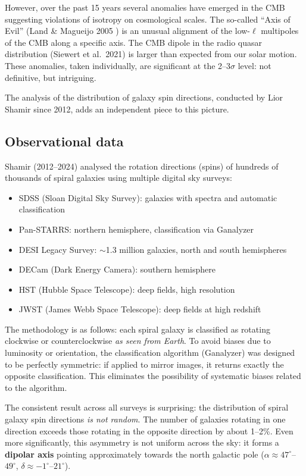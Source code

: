 \documentclass[10pt,a4paper]{article}
\begin{document}
However, over the past 15 years several anomalies have emerged in the CMB suggesting violations of isotropy on cosmological scales. The so-called ``Axis of Evil'' (Land \& Magueijo 2005 \cite{LandMagueijo2005}) is an unusual alignment of the low-$\ell$ multipoles of the CMB along a specific axis. The CMB dipole in the radio quasar distribution (Siewert et al.\ 2021) is larger than expected from our solar motion. These anomalies, taken individually, are significant at the 2--3$\sigma$ level: not definitive, but intriguing.

The analysis of the distribution of galaxy spin directions, conducted by Lior Shamir since 2012, adds an independent piece to this picture.

\subsection{Observational data}

Shamir (2012--2024) \cite{Shamir2022,Shamir2020,Shamir2022b,Shamir2024} analysed the rotation directions (spins) of hundreds of thousands of spiral galaxies using multiple digital sky surveys:
\begin{itemize}
\item SDSS (Sloan Digital Sky Survey): galaxies with spectra and automatic classification
\item Pan-STARRS: northern hemisphere, classification via Ganalyzer
\item DESI Legacy Survey: $\sim$1.3 million galaxies, north and south hemispheres
\item DECam (Dark Energy Camera): southern hemisphere
\item HST (Hubble Space Telescope): deep fields, high resolution
\item JWST (James Webb Space Telescope): deep fields at high redshift
\end{itemize}

The methodology is as follows: each spiral galaxy is classified as rotating clockwise or counterclockwise \textit{as seen from Earth}. To avoid biases due to luminosity or orientation, the classification algorithm (Ganalyzer) was designed to be perfectly symmetric: if applied to mirror images, it returns exactly the opposite classification. This eliminates the possibility of systematic biases related to the algorithm.

The consistent result across all surveys is surprising: the distribution of spiral galaxy spin directions \textit{is not random}. The number of galaxies rotating in one direction exceeds those rotating in the opposite direction by about 1--2\%. Even more significantly, this asymmetry is not uniform across the sky: it forms a \textbf{dipolar axis} pointing approximately towards the north galactic pole ($\alpha \approx 47^\circ$--$49^\circ$, $\delta \approx -1^\circ$--$21^\circ$).
\end{document}

